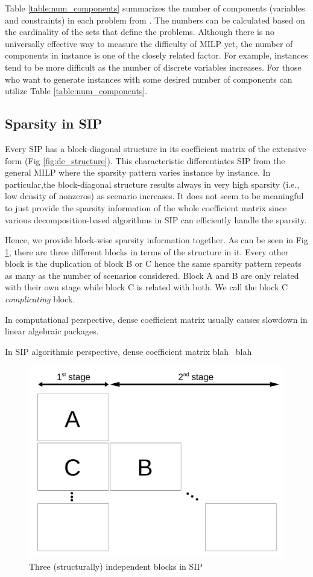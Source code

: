 Table \ref{table:num_components} summarizes the number of components (variables and constraints) in each problem from \siplibtwo. The numbers can be calculated based on the cardinality of the sets that define the problems. Although there is no universally effective way to measure the difficulty of MILP yet, the number of components in instance is one of the closely related factor. For example, instances tend to be more difficult as the number of discrete variables increases. For those who want to generate instances with some desired number of components can utilize Table \ref{table:num_components}.



\subsection{Sparsity in SIP}
Every SIP has a block-diagonal structure in its coefficient matrix of the extensive form (Fig \ref{fig:de_structure}). This characteristic differentiates SIP from the general MILP where the sparsity pattern varies instance by instance. In particular,the block-diagonal structure results always in very high sparsity (i.e., low density of nonzeros) as scenario increases. It does not seem to be meaningful to just provide the sparsity information of the whole coefficient matrix since various decomposition-based algorithms in SIP can efficiently handle the sparsity. 

Hence, we provide block-wise sparsity information together. As can be seen in Fig \ref{fig:stagewise_sparsity}, there are three different blocks in terms of the structure in it. Every other block is the duplication of block B or C hence the same sparsity pattern repeats as many as the number of scenarios considered. Block A and B are only related with their own stage while block C is related with both. We call the block C \textit{complicating} block. 

In computational perspective, dense coefficient matrix usually causes slowdown in linear algebraic packages. 

In SIP algorithmic perspective, dense coefficient matrix blah~ blah~



\begin{figure}
	\centering
	\includegraphics[width=0.7\linewidth]{drawings/stagewise_sparsity}
	\caption{Three (structurally) independent blocks in SIP}
	\label{fig:stagewise_sparsity}
\end{figure}







